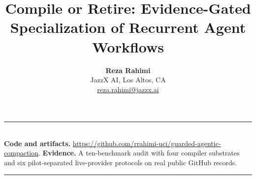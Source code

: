 \documentclass[11pt,a4paper,oneside]{article}
\title{\vspace{-10mm}%
  {\sffamily\bfseries\LARGE\color{paperblue}Compile or Retire: Evidence-Gated Specialization of Recurrent Agent Workflows}%
  \vspace{2mm}}
\author{%
  {\sffamily\bfseries Reza Rahimi}\\[1mm]
  {\small\sffamily JazzX AI, Los Altos, CA}\\[-0.5mm]
  {\small\sffamily\href{mailto:reza.rahimi@jazzx.ai}{reza.rahimi@jazzx.ai}}}
\date{}
\theoremstyle{gac}
\begin{document}
\maketitle
\thispagestyle{plain}
\vspace{-5mm}

{\small\sffamily\color{gacline!85}\noindent
\rule{\textwidth}{0.4pt}\\[1.6mm]
\textbf{Code and artifacts.} \url{https://github.com/rrahimi-uci/guarded-agentic-compaction}.\hfill
\textbf{Evidence.} A ten-benchmark audit with four compiler substrates and six
pilot-separated live-provider protocols on real public GitHub records.\\[1.2mm]
\rule{\textwidth}{0.4pt}}

\vspace{3mm}
\begin{abstract}
\noindent
\end{abstract}

\vspace{1mm}

\vspace{2mm}





\end{document}
